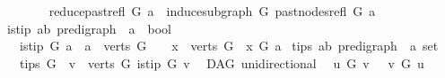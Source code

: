 \begin{isabellebody}
\ \ \ \isanewline
\ \ \ \ {\isachardoublequoteopen}reduce{\isacharunderscore}{\kern0pt}past{\isacharunderscore}{\kern0pt}refl\ G\ a\ {\isacharequal}{\kern0pt}\ induce{\isacharunderscore}{\kern0pt}subgraph\ G\ {\isacharparenleft}{\kern0pt}past{\isacharunderscore}{\kern0pt}nodes{\isacharunderscore}{\kern0pt}refl\ G\ a{\isacharparenright}{\kern0pt}{\isachardoublequoteclose}\isanewline
\isanewline
{}\isamarkupfalse%
\ is{\isacharunderscore}{\kern0pt}tip{\isacharcolon}{\kern0pt}{\isacharcolon}{\kern0pt}\ {\isachardoublequoteopen}{\isacharparenleft}{\kern0pt}{\isacharprime}{\kern0pt}a{\isacharcomma}{\kern0pt}{\isacharprime}{\kern0pt}b{\isacharparenright}{\kern0pt}\ pre{\isacharunderscore}{\kern0pt}digraph\ {\isasymRightarrow}\ {\isacharprime}{\kern0pt}a\ {\isasymRightarrow}\ bool{\isachardoublequoteclose}\isanewline
\ \ \ {\isachardoublequoteopen}is{\isacharunderscore}{\kern0pt}tip\ G\ a\ {\isacharequal}{\kern0pt}\ {\isacharparenleft}{\kern0pt}{\isacharparenleft}{\kern0pt}a\ {\isasymin}\ verts\ G{\isacharparenright}{\kern0pt}\ {\isasymand}\ \ {\isacharparenleft}{\kern0pt}{\isasymforall}\ x\ {\isasymin}\ verts\ G{\isachardot}{\kern0pt}\ {\isasymnot}\ x\ {\isasymrightarrow}\isactrlsup {\isacharplus}{\kern0pt}\isactrlbsub G\isactrlesub \ a{\isacharparenright}{\kern0pt}{\isacharparenright}{\kern0pt}{\isachardoublequoteclose}\isanewline
\isanewline
{}\isamarkupfalse%
\ tips{\isacharcolon}{\kern0pt}{\isacharcolon}{\kern0pt}\ {\isachardoublequoteopen}{\isacharparenleft}{\kern0pt}{\isacharprime}{\kern0pt}a{\isacharcomma}{\kern0pt}{\isacharprime}{\kern0pt}b{\isacharparenright}{\kern0pt}\ pre{\isacharunderscore}{\kern0pt}digraph\ {\isasymRightarrow}\ {\isacharprime}{\kern0pt}a\ set{\isachardoublequoteclose}\isanewline
\ \ \ {\isachardoublequoteopen}tips\ G\ {\isacharequal}{\kern0pt}\ {\isacharbraceleft}{\kern0pt}v\ {\isasymin}\ verts\ G{\isachardot}{\kern0pt}\ is{\isacharunderscore}{\kern0pt}tip\ G\ v{\isacharbraceright}{\kern0pt}{\isachardoublequoteclose}%
\isadelimdocument
%
\endisadelimdocument
%
\isatagdocument
%
\isamarkuptrue%
%
\endisatagdocument
{\isafolddocument}%
%
\isadelimdocument
%
\endisadelimdocument
{}\isamarkupfalse%
\ {\isacharparenleft}{\kern0pt}\ DAG{\isacharparenright}{\kern0pt}\ unidirectional{\isacharcolon}{\kern0pt}\isanewline
\ \ {\isachardoublequoteopen}u\ {\isasymrightarrow}\isactrlsup {\isacharplus}{\kern0pt}\isactrlbsub G\isactrlesub \ v\ {\isasymlongrightarrow}\ {\isasymnot}{\isacharparenleft}{\kern0pt}\ v\ {\isasymrightarrow}\isactrlsup {\isacharasterisk}{\kern0pt}\isactrlbsub G\isactrlesub \ u{\isacharparenright}{\kern0pt}{\isachardoublequoteclose}\isanewline

\end{isabellebody}
